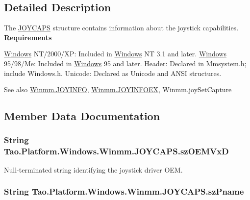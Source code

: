 \subsection{Detailed Description}
The \hyperlink{struct_tao_1_1_platform_1_1_windows_1_1_winmm_1_1_j_o_y_c_a_p_s}{JOYCAPS} structure contains information about the joystick capabilities. {\bfseries Requirements} 

\hyperlink{namespace_tao_1_1_platform_1_1_windows}{Windows} NT/2000/XP: Included in \hyperlink{namespace_tao_1_1_platform_1_1_windows}{Windows} NT 3.1 and later. \hyperlink{namespace_tao_1_1_platform_1_1_windows}{Windows} 95/98/Me: Included in \hyperlink{namespace_tao_1_1_platform_1_1_windows}{Windows} 95 and later. Header: Declared in Mmsystem.h; include Windows.h. Unicode: Declared as Unicode and ANSI structures. 

\begin{DoxySeeAlso}{See also}
\hyperlink{struct_tao_1_1_platform_1_1_windows_1_1_winmm_1_1_j_o_y_i_n_f_o}{Winmm.JOYINFO}, \hyperlink{struct_tao_1_1_platform_1_1_windows_1_1_winmm_1_1_j_o_y_i_n_f_o_e_x}{Winmm.JOYINFOEX}, Winmm.joySetCapture


\end{DoxySeeAlso}


\subsection{Member Data Documentation}
\hypertarget{struct_tao_1_1_platform_1_1_windows_1_1_winmm_1_1_j_o_y_c_a_p_s_a9a106677ae4b32a847733daa6d849789}{
\subsubsection[{szOEMVxD}]{\setlength{\rightskip}{0pt plus 5cm}String {\bf Tao.Platform.Windows.Winmm.JOYCAPS.szOEMVxD}}}
\label{struct_tao_1_1_platform_1_1_windows_1_1_winmm_1_1_j_o_y_c_a_p_s_a9a106677ae4b32a847733daa6d849789}


Null-\/terminated string identifying the joystick driver OEM. 

\hypertarget{struct_tao_1_1_platform_1_1_windows_1_1_winmm_1_1_j_o_y_c_a_p_s_a2c343e427e5772c38281c91e93f7898e}{
\subsubsection[{szPname}]{\setlength{\rightskip}{0pt plus 5cm}String {\bf Tao.Platform.Windows.Winmm.JOYCAPS.szPname}}}
\label{struct_tao_1_1_platform_1_1_windows_1_1_winmm_1_1_j_o_y_c_a_p_s_a2c343e427e5772c38281c91e93f7898e}


